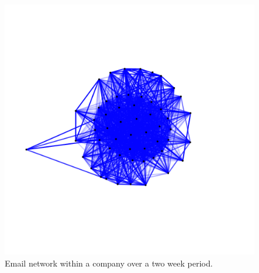\documentclass[11pt]{article}\usepackage[]{graphicx}\usepackage[]{color}
\begin{document}
\begin{figure}
\centering
\includegraphics[width=\textwidth]{figure/email_ex-1.pdf}
\caption{\label{fig.cap:email_ex} Email network within a company over a two week period.}
\end{figure}
\afterpage{\clearpage}
\end{document}

